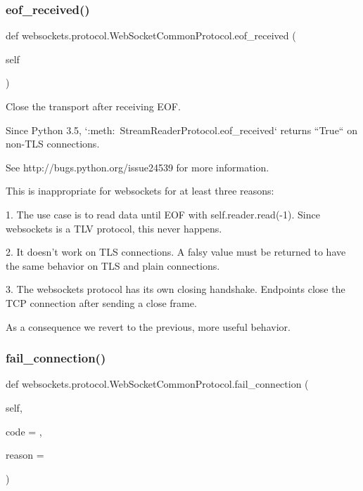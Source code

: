 \subsubsection{\texorpdfstring{eof\+\_\+received()}{eof\_received()}}
{\footnotesize\ttfamily def websockets.\+protocol.\+Web\+Socket\+Common\+Protocol.\+eof\+\_\+received (\begin{DoxyParamCaption}\item[{}]{self }\end{DoxyParamCaption})}

\begin{DoxyVerb}Close the transport after receiving EOF.

Since Python 3.5, `:meth:~StreamReaderProtocol.eof_received` returns
``True`` on non-TLS connections.

See http://bugs.python.org/issue24539 for more information.

This is inappropriate for websockets for at least three reasons:

1. The use case is to read data until EOF with self.reader.read(-1).
   Since websockets is a TLV protocol, this never happens.

2. It doesn't work on TLS connections. A falsy value must be
   returned to have the same behavior on TLS and plain connections.

3. The websockets protocol has its own closing handshake. Endpoints
   close the TCP connection after sending a close frame.

As a consequence we revert to the previous, more useful behavior.\end{DoxyVerb}
 \mbox{\label{classwebsockets_1_1protocol_1_1_web_socket_common_protocol_a618b79d4fa0be44b89561f8abab709e1}} 
\subsubsection{\texorpdfstring{fail\+\_\+connection()}{fail\_connection()}}
{\footnotesize\ttfamily def websockets.\+protocol.\+Web\+Socket\+Common\+Protocol.\+fail\+\_\+connection (\begin{DoxyParamCaption}\item[{}]{self,  }\item[{}]{code = {},  }\item[{}]{reason = {\ttfamily \textquotesingle{}\textquotesingle{}} }\end{DoxyParamCaption})}

